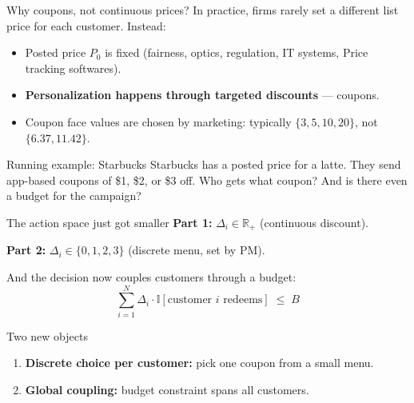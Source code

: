 \documentclass[aspectratio=169, 11pt, handout]{beamer}
\begin{document}
\begin{frame}{Why coupons, not continuous prices?}
In practice, firms rarely set a different list price for each customer. Instead:
\vspace{0.4em}

\begin{itemize}
    \item Posted price $P_0$ is fixed (fairness, optics, regulation, IT systems, Price tracking softwares).
    \item \textbf{Personalization happens through targeted discounts} --- coupons.
    \item Coupon face values are chosen by marketing: typically $\{3, 5, 10, 20\}$, not $\{6.37, 11.42\}$.
\end{itemize}
\vspace{0.6em}

\begin{exampleblock}{Running example: Starbucks}
Starbucks has a posted price for a latte. They send app-based coupons of \$1, \$2, or \$3 off. Who gets what coupon? And is there even a budget for the campaign?
\end{exampleblock}
\end{frame}

\begin{frame}{The action space just got smaller}
\textbf{Part 1:} $\Delta_i \in \mathbb{R}_+$ (continuous discount).
\vspace{0.4em}

\textbf{Part 2:} $\Delta_i \in \{0, 1, 2, 3\}$ (discrete menu, set by PM).
\vspace{0.8em}

And the decision now couples customers through a budget:
\[
\sum_{i=1}^{N} \Delta_i \cdot \mathbb{I}[\text{customer } i \text{ redeems}] \;\leq\; B
\]
\vspace{0.2em}

\begin{alertblock}{Two new objects}
\begin{enumerate}
    \item \textbf{Discrete choice per customer:} pick one coupon from a small menu.
    \item \textbf{Global coupling:} budget constraint spans all customers.
\end{enumerate}
\end{alertblock}
\end{frame}
\end{document}
